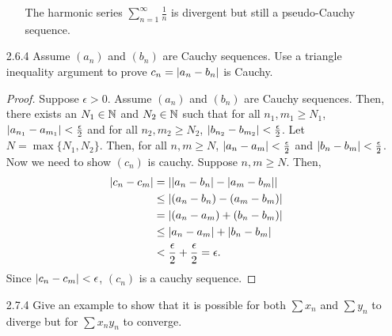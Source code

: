 \documentclass[12pt,letterpaper]{article}
\begin{document}
\begin{itemize}[leftmargin=!,labelindent=5pt]
\begin{itemize}
                The harmonic series $\sum_{n=1}^{\infty} \frac{1}{n}$ is divergent but still a pseudo-Cauchy sequence.
        \end{itemize}
    \item [2.6.4] Assume $(a_n)$ and $(b_n)$ are Cauchy sequences. Use a triangle inequality argument to prove $c_n = \abs{a_n - b_n}$ is Cauchy.
        \begin{proof}
            Suppose $\epsilon > 0$.
            Assume $(a_n)$ and $(b_n)$ are Cauchy sequences.
            Then, there exists an $N_1 \in \mathbb{N}$ and $N_2 \in \mathbb{N}$ such that for all $n_1, m_1 \geq N_1$, $\abs{a_{n_1} - a_{m_1}} < \frac{\epsilon}{2}$ and for all $n_2, m_2 \geq N_2$, $\abs{b_{n_2} - b_{m_2}} < \frac{\epsilon}{2}$.
            Let $N = \max \{N_1, N_2\}$.
            Then, for all $n, m \geq N$, $\abs{a_n - a_m} < \frac{\epsilon}{2}$ and $\abs{b_n - b_m} < \frac{\epsilon}{2}$.
            Now we need to show $(c_n)$ is cauchy. Suppose $n, m \geq N$. Then,
            \begin{align*}
                \abs{c_n - c_m} &= \abs{\abs{a_n - b_n} - \abs{a_m - b_m}}\\
                &\leq \abs{(a_n - b_n) - (a_m - b_m)}\\
                &= \abs{(a_n - a_m) + (b_n - b_m)}\\
                &\leq \abs{a_n - a_m} + \abs{b_n - b_m}\\
                &< \frac{\epsilon}{2} + \frac{\epsilon}{2} = \epsilon.
            \end{align*}
            Since $\abs{c_n - c_m} < \epsilon$, $(c_n)$ is a cauchy sequence.
        \end{proof}
    \newpage
    \item [2.7.4] Give an example to show that it is possible for both $\sum{x_n}$ and $\sum{y_n}$ to diverge but for $\sum{x_n y_n}$ to converge.
    

\end{itemize}
\end{document}
